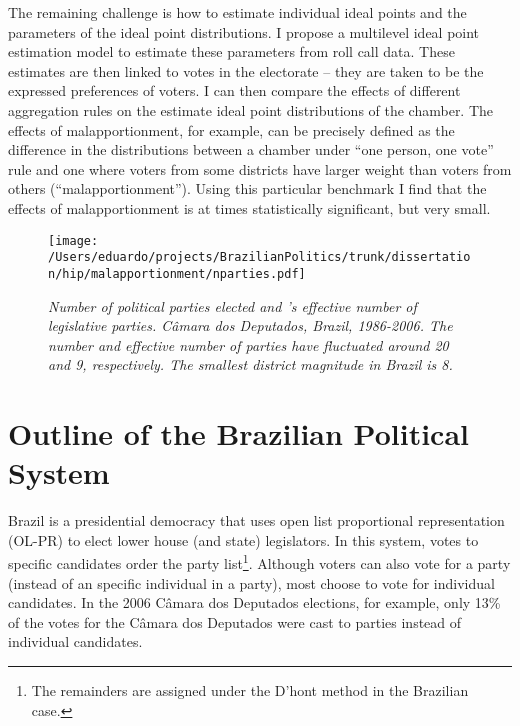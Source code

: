 The remaining challenge is how to estimate individual ideal points and the parameters of the  ideal point distributions. I propose a multilevel ideal point estimation model  to estimate these parameters from roll call data. These estimates are then linked to votes in the electorate -- they are taken to be the expressed preferences of voters. I can then compare the effects of different aggregation rules on the estimate ideal point distributions of the chamber. The effects of malapportionment, for example, can be precisely defined as the difference in the distributions between a chamber under ``one person, one vote'' rule and one where voters from some districts have larger weight than voters from others (``malapportionment''). Using this particular benchmark I find that the effects of malapportionment is at times statistically significant, but very small. 

\begin{figure}
  \centering
  \texttt{[image: /Users/eduardo/projects/BrazilianPolitics/trunk/dissertation/hip/malapportionment/nparties.pdf]}
  \caption{\emph{Number of political parties elected and \cite{laakso:1979}'s effective number of legislative parties. Câmara dos Deputados, Brazil, 1986-2006. The number and effective number of parties have fluctuated around 20 and 9, respectively. The smallest district magnitude  in Brazil is 8.}}
  \label{fig:nparties}
\end{figure}
 


\section{Outline of the Brazilian Political System}

Brazil is a presidential democracy that uses open list proportional representation (OL-PR) to elect lower house (and state) legislators. In this system,  votes to specific candidates order the party list\footnote{The remainders are assigned under the D'hont method in the Brazilian case.}. Although voters can also vote for a party (instead of an specific individual in a party), most choose to vote for individual candidates. In the 2006 Câmara dos Deputados elections, for example, only 13\% of the votes for the Câmara dos Deputados were cast to parties instead of individual candidates.  


